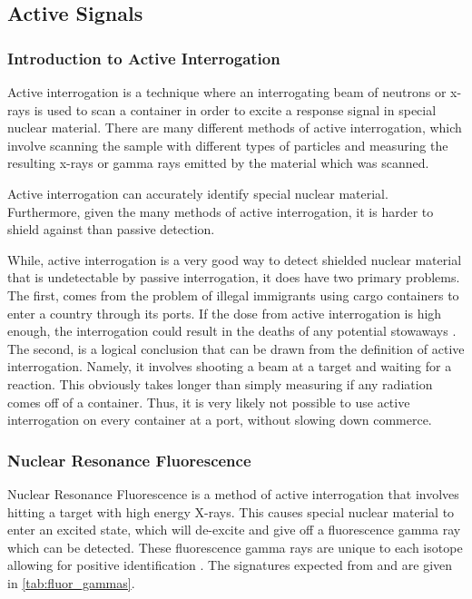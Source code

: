 \documentclass{report}
\newcommand{\myparagraph}[1]{\paragraph*{#1\\}}
\begin{document}
\subsection{Active Signals}


\subsubsection{Introduction to Active Interrogation} \label{sec:intro_active_interrogation}


Active interrogation is a technique where an interrogating beam of neutrons or x-rays is used to scan a container in order to excite a response signal in special nuclear material. There are many different methods of active interrogation, which involve scanning the sample with different types of particles and measuring the resulting x-rays or gamma rays emitted by the material which was scanned.

Active interrogation can accurately identify special nuclear material. Furthermore, given the many methods of active interrogation, it is harder to shield against than passive detection.

While, active interrogation is a very good way to detect shielded nuclear material that is undetectable by passive interrogation, it does have two primary problems. The first, comes from the problem of illegal immigrants using cargo containers to enter a country through its ports. If the dose from active interrogation is high enough, the interrogation could result in the deaths of any potential stowaways \cite{Morse2014}. The second, is a logical conclusion that can be drawn from the definition of active interrogation. Namely, it involves shooting a beam at a target and waiting for a reaction. This obviously takes longer than simply measuring if any radiation comes off of a container. Thus, it is very likely not possible to use active interrogation on every container at a port, without slowing down commerce.

\subsubsection{Nuclear Resonance Fluorescence}

Nuclear Resonance Fluorescence is a method of active interrogation that involves hitting a target with high energy X-rays. This causes special nuclear material to enter an excited state, which will de-excite and give off a fluorescence gamma ray which can be detected. These fluorescence gamma rays are unique to each isotope allowing for positive identification \cite{Morse2014a}. The signatures expected from  and  are given in \autoref{tab:fluor_gammas}.
\end{document}
